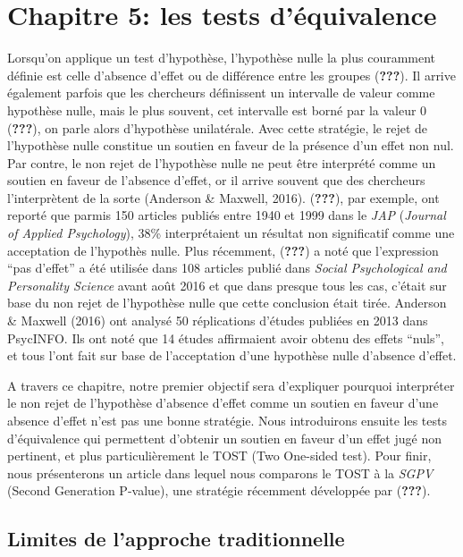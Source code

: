 \documentclass[
  english,
  man]{apa6}
\author{\phantom{0}}
\date{}
\affiliation{\phantom{0}}
\begin{document}
\hypertarget{chapitre-5-les-tests-duxe9quivalence}{%
\section{Chapitre 5: les tests d'équivalence}\label{chapitre-5-les-tests-duxe9quivalence}}

Lorsqu'on applique un test d'hypothèse, l'hypothèse nulle la plus couramment définie est celle d'absence d'effet ou de différence entre les groupes ({\textbf{???}}). Il arrive également parfois que les chercheurs définissent un intervalle de valeur comme hypothèse nulle, mais le plus souvent, cet intervalle est borné par la valeur 0 ({\textbf{???}}), on parle alors d'hypothèse unilatérale. Avec cette stratégie, le rejet de l'hypothèse nulle constitue un soutien en faveur de la présence d'un effet non nul. Par contre, le non rejet de l'hypothèse nulle ne peut être interprété comme un soutien en faveur de l'absence d'effet, or il arrive souvent que des chercheurs l'interprètent de la sorte (Anderson \& Maxwell, 2016). ({\textbf{???}}), par exemple, ont reporté que parmis 150 articles publiés entre 1940 et 1999 dans le \emph{JAP} (\emph{Journal of Applied Psychology}), 38\% interprétaient un résultat non significatif comme une acceptation de l'hypothès nulle. Plus récemment, ({\textbf{???}}) a noté que l'expression \enquote{pas d'effet} a été utilisée dans 108 articles publié dans \emph{Social Psychological and Personality Science} avant août 2016 et que dans presque tous les cas, c'était sur base du non rejet de l'hypothèse nulle que cette conclusion était tirée. Anderson \& Maxwell (2016) ont analysé 50 réplications d'études publiées en 2013 dans PsycINFO. Ils ont noté que 14 études affirmaient avoir obtenu des effets \enquote{nuls}, et tous l'ont fait sur base de l'acceptation d'une hypothèse nulle d'absence d'effet.

A travers ce chapitre, notre premier objectif sera d'expliquer pourquoi interpréter le non rejet de l'hypothèse d'absence d'effet comme un soutien en faveur d'une absence d'effet n'est pas une bonne stratégie. Nous introduirons ensuite les tests d'équivalence qui permettent d'obtenir un soutien en faveur d'un effet jugé non pertinent, et plus particulièrement le TOST (Two One-sided test). Pour finir, nous présenterons un article dans lequel nous comparons le TOST à la \emph{SGPV} (Second Generation P-value), une stratégie récemment développée par ({\textbf{???}}).

\hypertarget{limites-de-lapproche-traditionnelle}{%
\subsection{Limites de l'approche traditionnelle}\label{limites-de-lapproche-traditionnelle}}
\end{document}
